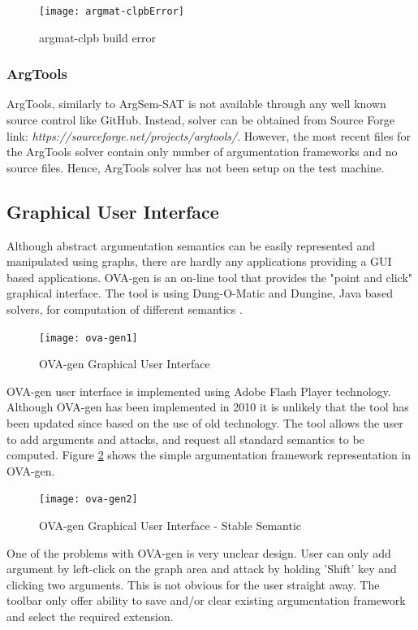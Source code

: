 \begin{figure}[h]
	\centering
	\texttt{[image: argmat-clpbError]}
	\caption{argmat-clpb build error}
	\label{fig:argmatClpbError}
\end{figure}

\subsubsection{ArgTools}
ArgTools, similarly to ArgSem-SAT is not available through any well known source control like GitHub. Instead, solver can be obtained from Source Forge link: \textit{https://sourceforge.net/projects/argtools/}. However, the most recent files for the ArgTools solver contain only number of argumentation frameworks and no source files. Hence, ArgTools solver has not been setup on the test machine.


\subsection{Graphical User Interface}
Although abstract argumentation semantics can be easily represented and manipulated using graphs, there are hardly any applications providing a GUI based applications. OVA-gen is an on-line tool that provides the "point and click" graphical interface. The tool is using Dung-O-Matic and Dungine, Java based solvers, for computation of different semantics \citep{ova-gen}. 

\begin{figure}[h]
	\centering
	\texttt{[image: ova-gen1]}
	\caption{OVA-gen Graphical User Interface}
	\label{fig:ovagen1}
\end{figure}

OVA-gen user interface is implemented using Adobe Flash Player technology. Although OVA-gen has been implemented in 2010 it is unlikely that the tool has been updated since based on the use of old technology. The tool allows the user to add arguments and attacks, and request all standard semantics to be computed. Figure \ref{fig:ovagen1} shows the simple argumentation framework representation in OVA-gen.

\begin{figure}[h]
	\centering
	\texttt{[image: ova-gen2]}
	\caption{OVA-gen Graphical User Interface - Stable Semantic}
	\label{fig:ovagen2}
\end{figure}

One of the problems with OVA-gen is very unclear design. User can only add argument by left-click on the graph area and attack by holding 'Shift' key and clicking two arguments. This is not obvious for the user straight away. The toolbar only offer ability to save and/or clear existing argumentation framework and select the required extension. 

